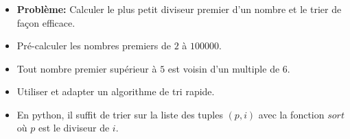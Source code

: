 \begin{frame}
    \frametitle{\problemtitle}
    \begin{itemize}
        \item<+-> \textbf{Problème:} Calculer le plus petit diviseur premier d'un nombre et le trier de façon efficace.
        \item<+-> Pré-calculer les nombres premiers de $2$ à $100000$.
        \item<+-> Tout nombre premier supérieur à $5$ est voisin d'un multiple de $6$.
        \item<+-> Utiliser et adapter un algorithme de tri rapide.
        \item<+-> En python, il suffit de trier sur la liste des tuples $(p, i)$ avec la fonction $sort$ où $p$ est le diviseur de $i$.

    \end{itemize}
\end{frame}
